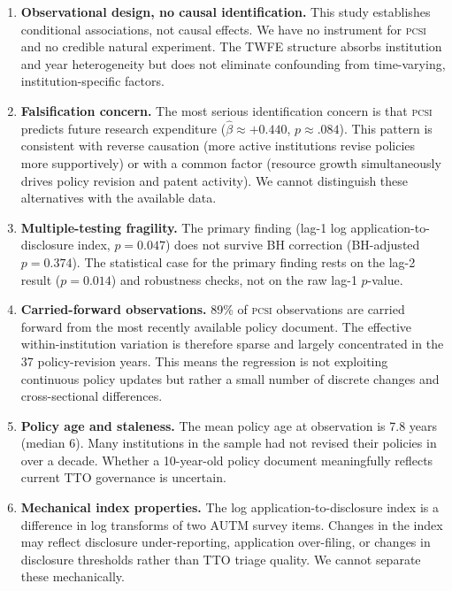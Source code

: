 \documentclass[12pt]{article}
\newcommand{\PCSI}{\textsc{pcsi}}
\begin{document}
\begin{enumerate}

\item \textbf{Observational design, no causal identification.} This study establishes
conditional associations, not causal effects. We have no instrument for \PCSI{} and no
credible natural experiment. The TWFE structure absorbs institution and year heterogeneity
but does not eliminate confounding from time-varying, institution-specific factors.

\item \textbf{Falsification concern.} The most serious identification concern is that
\PCSI{} predicts future research expenditure ($\hat\beta\approx+0.440$, $p\approx.084$).
This pattern is consistent with reverse causation (more active institutions revise
policies more supportively) or with a common factor (resource growth simultaneously
drives policy revision and patent activity). We cannot distinguish these alternatives
with the available data.

\item \textbf{Multiple-testing fragility.} The primary finding (lag-1 log
application-to-disclosure index, $p=0.047$) does not survive BH correction
(BH-adjusted $p=0.374$). The statistical case for the primary finding rests on the
lag-2 result ($p=0.014$) and robustness checks, not on the raw lag-1 $p$-value.

\item \textbf{Carried-forward observations.} 89\% of \PCSI{} observations are
carried forward from the most recently available policy document. The effective
within-institution variation is therefore sparse and largely concentrated in the
37 policy-revision years. This means the regression is not exploiting continuous
policy updates but rather a small number of discrete changes and cross-sectional
differences.

\item \textbf{Policy age and staleness.} The mean policy age at observation is 7.8
years (median 6). Many institutions in the sample had not revised their policies
in over a decade. Whether a 10-year-old policy document meaningfully reflects
current TTO governance is uncertain.

\item \textbf{Mechanical index properties.} The log application-to-disclosure index
is a difference in log transforms of two AUTM survey items. Changes in the index
may reflect disclosure under-reporting, application over-filing, or changes in
disclosure thresholds rather than TTO triage quality. We cannot separate these
mechanically.


\end{enumerate}
\end{document}
